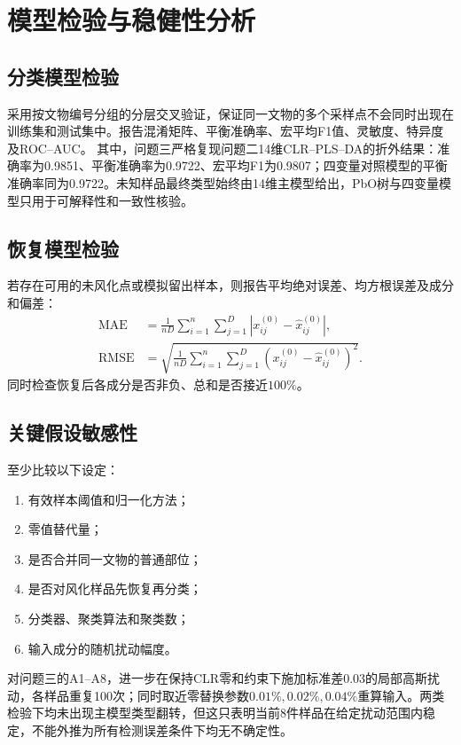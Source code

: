 \section{模型检验与稳健性分析}

\subsection{分类模型检验}
采用按文物编号分组的分层交叉验证，保证同一文物的多个采样点不会同时出现在训练集和测试集中。报告混淆矩阵、平衡准确率、宏平均F1值、灵敏度、特异度及ROC--AUC。
其中，问题三严格复现问题二14维CLR--PLS--DA的折外结果：准确率为0.9851、平衡准确率为0.9722、宏平均F1为0.9807；四变量对照模型的平衡准确率同为0.9722。未知样品最终类型始终由14维主模型给出，PbO树与四变量模型只用于可解释性和一致性核验。

\subsection{恢复模型检验}
若存在可用的未风化点或模拟留出样本，则报告平均绝对误差、均方根误差及成分和偏差：
\begin{align}
  \mathrm{MAE} &= \frac{1}{nD}\sum_{i=1}^n\sum_{j=1}^D
  \left|x_{ij}^{(0)}-\hat{x}_{ij}^{(0)}\right|,\\
  \mathrm{RMSE} &= \sqrt{\frac{1}{nD}\sum_{i=1}^n\sum_{j=1}^D
  \left(x_{ij}^{(0)}-\hat{x}_{ij}^{(0)}\right)^2}.
\end{align}
同时检查恢复后各成分是否非负、总和是否接近\(100\%\)。

\subsection{关键假设敏感性}
至少比较以下设定：
\begin{enumerate}
  \item 有效样本阈值和归一化方法；
  \item 零值替代量；
  \item 是否合并同一文物的普通部位；
  \item 是否对风化样品先恢复再分类；
  \item 分类器、聚类算法和聚类数；
  \item 输入成分的随机扰动幅度。
\end{enumerate}

对问题三的A1--A8，进一步在保持CLR零和约束下施加标准差0.03的局部高斯扰动，各样品重复100次；同时取近零替换参数$0.01\%,0.02\%,0.04\%$重算输入。两类检验下均未出现主模型类型翻转，但这只表明当前8件样品在给定扰动范围内稳定，不能外推为所有检测误差条件下均无不确定性。

